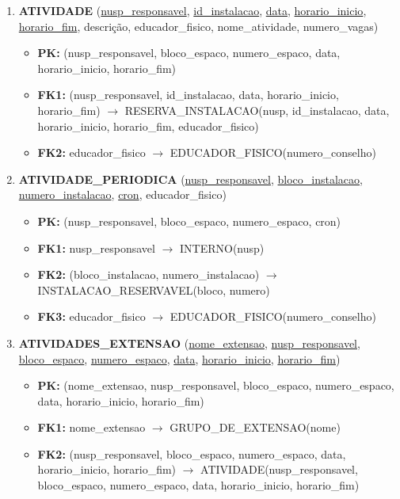 \documentclass{article}
\begin{document}
\begin{enumerate}
    \item \textbf{ATIVIDADE} (\underline{nusp\_responsavel}, \underline{id\_instalacao}, \underline{data}, \underline{horario\_inicio}, \underline{horario\_fim}, descrição, educador\_fisico, nome\_atividade, numero\_vagas)
        \begin{itemize}
            \item \textbf{PK:} (nusp\_responsavel, bloco\_espaco, numero\_espaco, data, horario\_inicio, horario\_fim)
            \item \textbf{FK1:} (nusp\_responsavel, id\_instalacao, data, horario\_inicio, horario\_fim) $\rightarrow$ RESERVA\_INSTALACAO(nusp, id\_instalacao, data, horario\_inicio, horario\_fim, educador\_fisico)
            \item \textbf{FK2:} educador\_fisico $\rightarrow$ EDUCADOR\_FISICO(numero\_conselho)
        \end{itemize}

    \item \textbf{ATIVIDADE\_PERIODICA} (\underline{nusp\_responsavel}, \underline{bloco\_instalacao}, \underline{numero\_instalacao}, \underline{cron}, educador\_fisico)
        \begin{itemize}
            \item \textbf{PK:} (nusp\_responsavel, bloco\_espaco, numero\_espaco, cron)
            \item \textbf{FK1:} nusp\_responsavel $\rightarrow$ INTERNO(nusp)
            \item \textbf{FK2:} (bloco\_instalacao, numero\_instalacao) $\rightarrow$ INSTALACAO\_RESERVAVEL(bloco, numero)
            \item \textbf{FK3:} educador\_fisico $\rightarrow$ EDUCADOR\_FISICO(numero\_conselho)
        \end{itemize}

    \item \textbf{ATIVIDADES\_EXTENSAO} (\underline{nome\_extensao}, \underline{nusp\_responsavel}, \underline{bloco\_espaco}, \underline{numero\_espaco}, \underline{data}, \underline{horario\_inicio}, \underline{horario\_fim})
        \begin{itemize}
            \item \textbf{PK:} (nome\_extensao, nusp\_responsavel, bloco\_espaco, numero\_espaco, data, horario\_inicio, horario\_fim)
            \item \textbf{FK1:} nome\_extensao $\rightarrow$ GRUPO\_DE\_EXTENSAO(nome)
            \item \textbf{FK2:} (nusp\_responsavel, bloco\_espaco, numero\_espaco, data, horario\_inicio, horario\_fim) $\rightarrow$ ATIVIDADE(nusp\_responsavel, bloco\_espaco, numero\_espaco, data, horario\_inicio, horario\_fim)
        \end{itemize}


\end{enumerate}
\end{document}
